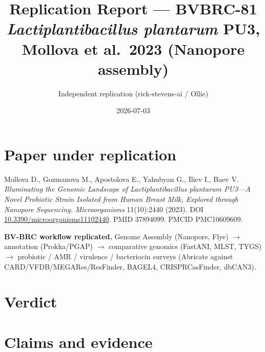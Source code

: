 \documentclass[11pt,a4paper]{article}
\title{Replication Report --- BVBRC-81\\
\large \textit{Lactiplantibacillus plantarum} PU3, Mollova et al.\ 2023 (Nanopore assembly)}
\author{Independent replication (rick-stevens-ai / Ollie)}
\date{2026-07-03}
\begin{document}
\maketitle

\section{Paper under replication}

Mollova D., Gozmanova M., Apostolova E., Yahubyan G., Iliev I., Baev V.
\textit{Illuminating the Genomic Landscape of Lactiplantibacillus plantarum PU3---A
Novel Probiotic Strain Isolated from Human Breast Milk, Explored through Nanopore
Sequencing.} \textit{Microorganisms} 11(10):2440 (2023).
DOI \href{https://doi.org/10.3390/microorganisms11102440}{10.3390/microorganisms11102440}.
PMID 37894099. PMCID PMC10609609.

\medskip
\noindent\textbf{BV-BRC workflow replicated.} Genome Assembly (Nanopore, Flye)
$\rightarrow$ annotation (Prokka/PGAP) $\rightarrow$ comparative genomics (FastANI,
MLST, TYGS) $\rightarrow$ probiotic / AMR / virulence / bacteriocin surveys
(Abricate against CARD/VFDB/MEGARes/ResFinder, BAGEL4, CRISPRCasFinder, dbCAN3).

\section{Verdict}

\noindent{}

\section{Claims and evidence}
\end{document}
